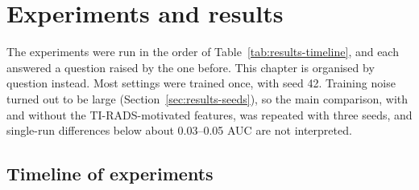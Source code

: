 \chapter{Experiments and results}
\label{ch:results}

The experiments were run in the order of Table~\ref{tab:results-timeline}, and each answered a
question raised by the one before. This chapter is organised by question instead. Most settings
were trained once, with seed 42. Training noise turned out to be large
(Section~\ref{sec:results-seeds}), so the main comparison, with and without the TI-RADS-motivated
features, was repeated with three seeds, and single-run differences below about 0.03--0.05 AUC are
not interpreted.

\section{Timeline of experiments}
\label{sec:results-timeline}

